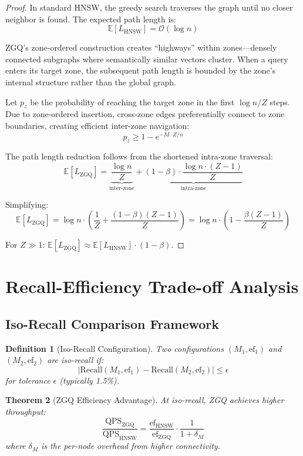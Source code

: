 \documentclass[11pt,a4paper]{article}
\newtheorem{theorem}{Theorem}[section]
\newtheorem{definition}[theorem]{Definition}
\newcommand{\BigO}{\mathcal{O}}
\newcommand{\recall}{\text{Recall}}
\newcommand{\qps}{\text{QPS}}
\newcommand{\ef}{\text{ef}}
\newcommand{\zgq}{\text{ZGQ}}
\newcommand{\hnsw}{\text{HNSW}}
\begin{document}
\begin{proof}
In standard HNSW, the greedy search traverses the graph until no closer neighbor is found. The expected path length is:
\[
\mathbb{E}[L_{\hnsw}] = \BigO(\log n)
\]

ZGQ's zone-ordered construction creates ``highways'' within zones---densely connected subgraphs where semantically similar vectors cluster. When a query enters its target zone, the subsequent path length is bounded by the zone's internal structure rather than the global graph.

Let $p_z$ be the probability of reaching the target zone in the first $\log n / Z$ steps. Due to zone-ordered insertion, cross-zone edges preferentially connect to zone boundaries, creating efficient inter-zone navigation:
\[
p_z \geq 1 - e^{-M \cdot Z / n}
\]

The path length reduction follows from the shortened intra-zone traversal:
\[
\mathbb{E}[L_{\zgq}] = \underbrace{\frac{\log n}{Z}}_{\text{inter-zone}} + \underbrace{(1-\beta) \cdot \frac{\log n \cdot (Z-1)}{Z}}_{\text{intra-zone}}
\]

Simplifying:
\[
\mathbb{E}[L_{\zgq}] = \log n \cdot \left(\frac{1}{Z} + \frac{(1-\beta)(Z-1)}{Z}\right) = \log n \cdot \left(1 - \frac{\beta(Z-1)}{Z}\right)
\]

For $Z \gg 1$: $\mathbb{E}[L_{\zgq}] \approx \mathbb{E}[L_{\hnsw}] \cdot (1 - \beta)$.
\end{proof}

\section{Recall-Efficiency Trade-off Analysis}

\subsection{Iso-Recall Comparison Framework}

\begin{definition}[Iso-Recall Configuration]
Two configurations $(M_1, \ef_1)$ and $(M_2, \ef_2)$ are \textit{iso-recall} if:
\[
|\recall(M_1, \ef_1) - \recall(M_2, \ef_2)| \leq \epsilon
\]
for tolerance $\epsilon$ (typically 1.5\%).
\end{definition}

\begin{theorem}[ZGQ Efficiency Advantage]
\label{thm:efficiency}
At iso-recall, ZGQ achieves higher throughput:
\[
\frac{\qps_{\zgq}}{\qps_{\hnsw}} = \frac{\ef_{\hnsw}}{\ef_{\zgq}} \cdot \frac{1}{1 + \delta_M}
\]
where $\delta_M$ is the per-node overhead from higher connectivity.
\end{theorem}
\end{document}
